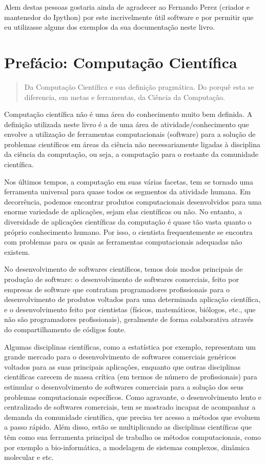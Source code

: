\documentclass[a4paper,10pt,brazil]{sphinxmanual}
\begin{document}
Alem destas pessoas gostaria ainda de agradecer ao Fernando Perez
(criador e mantenedor do Ipython) por este incrivelmente útil
software e por permitir que eu utilizasse alguns dos exemplos da
sua documentação neste livro.


\chapter{Prefácio: Computação Científica}
\label{Cap1:prefacio-computacao-cientifica}\label{Cap1:prefacio}\label{Cap1::doc}\begin{quote}

Da Computação Científica e sua definição pragmática. Do porquê esta se diferencia, em metas e ferramentas, da Ciência da Computação.
\end{quote}

Computação científica não é uma área do conhecimento muito bem definida. A definição utilizada neste livro é a de uma área de atividade/conhecimento que envolve a utilização de ferramentas computacionais (software) para a solução de problemas científicos em áreas da ciência não necessariamente ligadas à disciplina da ciência da computação, ou seja, a computação para o restante da comunidade científica.

Nos últimos tempos, a computação em suas várias facetas, tem se tornado uma ferramenta universal para quase todos os segmentos da atividade humana. Em decorrência, podemos encontrar produtos computacionais desenvolvidos para uma enorme variedade de aplicações, sejam elas científicas ou não. No entanto, a diversidade de aplicações científicas da computação é quase tão vasta quanto o próprio conhecimento humano. Por isso, o cientista frequentemente se encontra com problemas para os quais as ferramentas computacionais adequadas não existem.

No desenvolvimento de softwares científicos, temos dois modos principais de produção de software: o desenvolvimento de softwares comerciais, feito por empresas de software que contratam programadores profissionais para o desenvolvimento de produtos voltados para uma determinada aplicação científica, e o desenvolvimento feito por cientistas (físicos, matemáticos, biólogos, etc., que não são programadores profissionais), geralmente de forma colaborativa através do compartilhamento de códigos fonte.

Algumas disciplinas científicas, como a estatística por exemplo, representam um grande mercado para o desenvolvimento de softwares comerciais genéricos voltados para as suas principais aplicações, enquanto que outras disciplinas científicas carecem de massa crítica (em termos de número de profissionais) para estimular o desenvolvimento de softwares comerciais para a solução dos seus problemas computacionais específicos. Como agravante, o desenvolvimento lento e centralizado de softwares comerciais, tem se mostrado incapaz de acompanhar a demanda da comunidade científica, que precisa ter acesso a métodos que evoluem a passo rápido. Além disso, estão se multiplicando as disciplinas científicas que têm como sua ferramenta principal de trabalho os métodos computacionais, como por exemplo a bio-informática, a modelagem de sistemas complexos, dinâmica molecular e etc.
\end{document}
